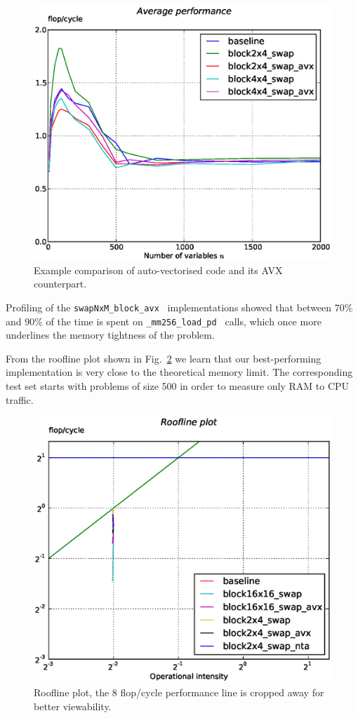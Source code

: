 \documentclass[letterpaper]{article}
\begin{document}
\begin{figure}\centering
  \includegraphics[scale=0.4]{img/results_avx.eps}
  \caption{Example comparison of auto-vectorised code and its AVX counterpart.\label{fig:res_avx}}
\end{figure}

Profiling of the {\tt swapNxM\_block\_avx } implementations showed that between 70\% and 90\% of the time is spent on {\tt \_mm256\_load\_pd } calls,
which once more underlines the memory tightness of the problem.

From the roofline plot shown in Fig.~\ref{fig:res_roof_high} we learn that our best-performing implementation is very close to the theoretical memory limit.
The corresponding test set starts with problems of size 500 in order to measure only RAM to CPU traffic.

\begin{figure}\centering
  \includegraphics[scale=0.4]{img/roof_high_autovec.eps}
  \caption{Roofline plot, the 8 flop/cycle performance line is cropped away for better viewability.\label{fig:res_roof_high}}
\end{figure}
\end{document}
